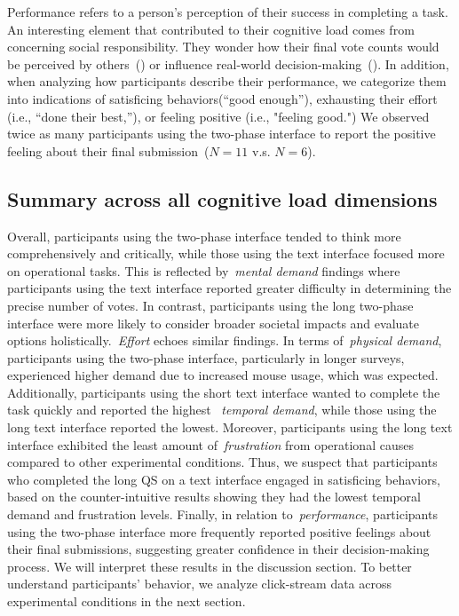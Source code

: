 Performance refers to a person's perception of their success in completing a task. An interesting element that contributed to their cognitive load comes from concerning social responsibility. They wonder how their final vote counts would be perceived by others~() or influence real-world decision-making~(). In addition, when analyzing how participants describe their performance, we categorize them into indications of satisficing behaviors(``good enough''), exhausting their effort (i.e., ``done their best,''), or feeling positive (i.e., "feeling good.") We observed twice as many participants using the two-phase interface to report the positive feeling about their final submission~($N=11$ v.s. $N=6$).

\subsection{Summary across all cognitive load dimensions}
Overall, participants using the two-phase interface tended to think more comprehensively and critically, while those using the text interface focused more on operational tasks. This is reflected by~\textit{mental demand} findings where participants using the text interface reported greater difficulty in determining the precise number of votes. In contrast, participants using the long two-phase interface were more likely to consider broader societal impacts and evaluate options holistically.~\textit{Effort} echoes similar findings. In terms of~\textit{physical demand}, participants using the two-phase interface, particularly in longer surveys, experienced higher demand due to increased mouse usage, which was expected. Additionally, participants using the short text interface wanted to complete the task quickly and reported the highest ~\textit{temporal demand}, while those using the long text interface reported the lowest. Moreover, participants using the long text interface exhibited the least amount of~\textit{frustration} from operational causes compared to other experimental conditions. Thus, we suspect that participants who completed the long QS on a text interface engaged in satisficing behaviors, based on the counter-intuitive results showing they had the lowest temporal demand and frustration levels. Finally, in relation to~\textit{performance}, participants using the two-phase interface more frequently reported positive feelings about their final submissions, suggesting greater confidence in their decision-making process. We will interpret these results in the discussion section. To better understand participants' behavior, we analyze click-stream data across experimental conditions in the next section.

